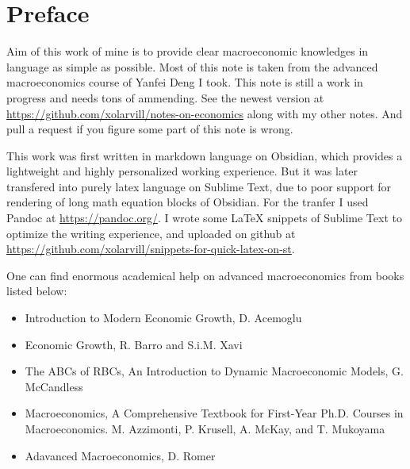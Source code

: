 \section*{Preface}

Aim of this work of mine is to provide clear macroeconomic knowledges in language as simple as possible. Most of this note is taken from the advanced macroeconomics course of Yanfei Deng I took. This note is still a work in progress and needs tons of ammending. See the newest version at \url{https://github.com/xolarvill/notes-on-economics} along with my other notes. And pull a request if you figure some part of this note is wrong.

This work was first written in markdown language on Obsidian, which provides a lightweight and highly personalized working experience. But it was later transfered into purely latex language on Sublime Text, due to poor support for rendering of long math equation blocks of Obsidian. For the tranfer I used Pandoc at \url{https://pandoc.org/}. I wrote some LaTeX snippets of Sublime Text to optimize the writing experience, and uploaded on github at \url{https://github.com/xolarvill/snippets-for-quick-latex-on-st}.

One can find enormous academical help on advanced macroeconomics from books listed below:
\begin{itemize}
\tightlist
  \item Introduction to Modern Economic Growth, D. Acemoglu
  \item Economic Growth, R. Barro and S.i.M. Xavi
  \item The ABCs of RBCs, An Introduction to Dynamic Macroeconomic Models, G. McCandless
  \item Macroeconomics, A Comprehensive Textbook for First-Year Ph.D. Courses in Macroeconomics. M. Azzimonti, P. Krusell, A. McKay, and T. Mukoyama
  \item Adavanced Macroeconomics, D. Romer
\end{itemize}
